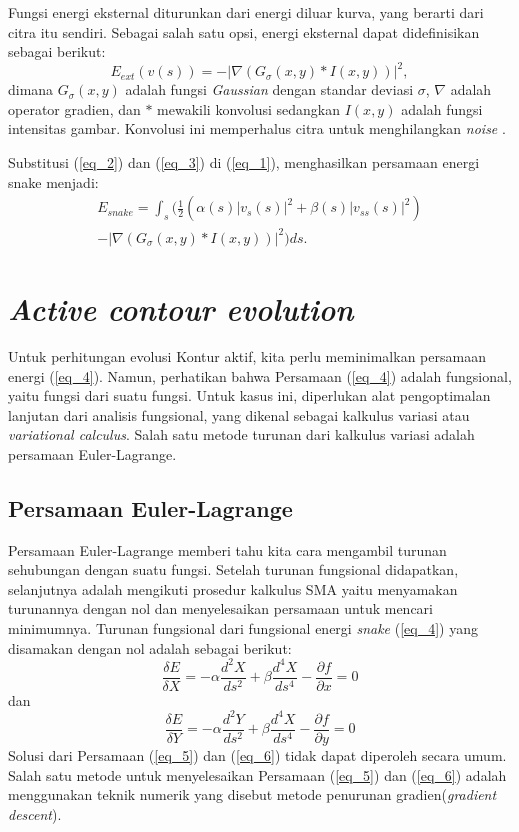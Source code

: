 Fungsi energi eksternal diturunkan dari energi diluar kurva, yang berarti dari citra itu sendiri. Sebagai salah satu opsi, energi eksternal dapat didefinisikan sebagai berikut:
\begin{equation}
\label{eq_3}
E_{ext} (v(s)) = -|\nabla (  G_{\sigma}(x,y) \ast I(x,y) ) |^2,
\end{equation}
dimana $G_{\sigma}(x,y)$ adalah fungsi \emph{Gaussian} dengan standar deviasi $\sigma$, $\nabla$ adalah operator gradien, dan $\ast$ mewakili konvolusi sedangkan $I(x,y)$ adalah fungsi intensitas gambar. Konvolusi ini memperhalus citra untuk menghilangkan \emph{noise} \citep{abdullah2016robust}.

Substitusi (\ref{eq_2}) dan (\ref{eq_3}) di (\ref{eq_1}), menghasilkan persamaan energi snake menjadi:
\begin{multline}
\label{eq_4}
E_{snake} = \int^{}_{s} \biggl(
			\frac{1}{2} \left(\alpha(s)|v_{s}(s)|^2 + \beta(s)|v_{ss}(s)|^2\right) \\
			-|\nabla (  G_{\sigma}(x,y) \ast I(x,y) ) |^2  \biggr)ds.
\end{multline}

\section{\emph{Active contour evolution}}
Untuk perhitungan evolusi Kontur aktif, kita perlu meminimalkan persamaan energi (\ref{eq_4}). Namun, perhatikan bahwa Persamaan (\ref{eq_4}) adalah fungsional, yaitu fungsi dari suatu fungsi. Untuk kasus ini, diperlukan alat pengoptimalan lanjutan dari analisis fungsional, yang dikenal sebagai kalkulus variasi atau \emph{variational calculus}. Salah satu metode turunan dari kalkulus variasi adalah persamaan Euler-Lagrange\citep{acton2007biomedical:19}.	
\subsection{Persamaan Euler-Lagrange}
Persamaan Euler-Lagrange memberi tahu kita cara mengambil turunan sehubungan dengan suatu fungsi. Setelah turunan fungsional didapatkan, selanjutnya adalah mengikuti prosedur kalkulus SMA yaitu menyamakan turunannya dengan nol dan menyelesaikan persamaan untuk mencari minimumnya. Turunan fungsional dari fungsional energi \emph{snake} (\ref{eq_4}) yang disamakan dengan nol adalah sebagai berikut\citep{acton2007biomedical:19}:
\begin{equation}
\label{eq_5}
\frac{\delta E}{\delta X} = -\alpha \frac{d^2 X}{ds^2} + \beta \frac{d^4 X}{ds^4} - \frac{\partial f}{\partial x} = 0
\end{equation}
dan
\begin{equation}
\label{eq_6}
\frac{\delta E}{\delta Y} = -\alpha \frac{d^2 Y}{ds^2} + \beta \frac{d^4 X}{ds^4} - \frac{\partial f}{\partial y} = 0
\end{equation}
Solusi dari Persamaan (\ref{eq_5}) dan (\ref{eq_6}) tidak dapat diperoleh secara umum. Salah satu metode untuk menyelesaikan Persamaan (\ref{eq_5}) dan (\ref{eq_6}) adalah menggunakan teknik numerik yang disebut metode penurunan gradien(\emph{gradient descent}).

